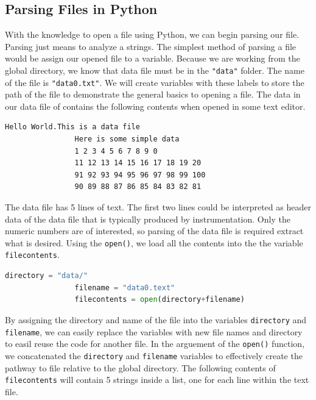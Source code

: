 \documentclass[11pt,a4paper]{book}
\begin{document}
			\subsection{Parsing Files in Python}
				\label{sub:Parsing Files in Python}
				With the knowledge to open a file using Python, we can begin parsing our file. Parsing just means to analyze a strings. The simplest method of parsing a file would be assign our opened file to a variable. Because we are working from the global directory, we know that data file must be in the \lstinline|"data"| folder. The name of the file is \lstinline|"data0.txt"|. We will create variables with these labels to store the path of the file to demonstrate the general basics to opening a file. The data in our data file of contains the following contents when opened in some text editor. 
				
				\begin{lstlisting}[caption=The contents of the raw data file.]
				Hello World.This is a data file
				Here is some simple data
				1 2 3 4 5 6 7 8 9 0
				11 12 13 14 15 16 17 18 19 20
				91 92 93 94 95 96 97 98 99 100
				90 89 88 87 86 85 84 83 82 81
				\end{lstlisting}
				
				The data file has 5 lines of text. The first two lines could be interpreted as header data of the data file that is typically produced by instrumentation. Only the numeric numbers are of interested, so parsing of the data file is required extract what is desired. Using the \lstinline|open()|, we load all the contents into the the variable \lstinline|filecontents|.
				
				\begin{lstlisting}[language=Python, caption = The data file being opened in python and passed on to]
				directory = "data/"
				filename = "data0.text"
				filecontents = open(directory+filename)
				\end{lstlisting}
				
				By assigning the directory and name of the file into the variables \lstinline|directory| and \lstinline|filename|, we can easily replace the variables with new file names and directory to easil reuse the code for another file. In the arguement of the \lstinline|open()| function, we concatenated the \lstinline|directory| and \lstinline|filename| variables to effectively create the pathway to file relative to the global directory.
				The following contents of \lstinline|filecontents| will contain 5 strings inside a list, one for each line within the text file.
				
\end{document}
